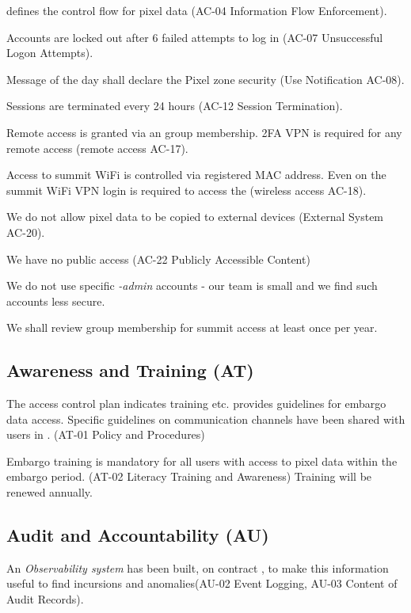  defines the control flow for pixel data (AC-04  Information Flow Enforcement).

Accounts are locked out after 6 failed attempts to log in (AC-07  Unsuccessful Logon Attempts).

Message of the day shall declare the Pixel zone security (Use Notification AC-08).

Sessions are terminated every 24 hours (AC-12  Session Termination).

Remote access is granted via an group membership. 2FA VPN is required for any remote access (remote access AC-17).

Access to summit WiFi is controlled via registered MAC address.
Even on the summit WiFi VPN login is required to access the \PZ (wireless access AC-18).


We do not allow pixel data to be copied to external devices (External System AC-20).

We have no public access (AC-22  Publicly Accessible Content)

We do not use specific \emph{-admin} accounts  - our team is small and we find such accounts less secure.

We shall review group membership for summit access at least once per year.



\subsection{Awareness and Training (AT)} \label{sec:AT}

The access control plan \citep{ACP} indicates training etc.
 provides guidelines for embargo data access.
Specific guidelines on communication channels have been shared with users in .
(AT-01  Policy and Procedures)

Embargo training is mandatory for all users with access to pixel data within the embargo period. (AT-02  Literacy Training and Awareness)
Training will be renewed annually.


\subsection{Audit and Accountability (AU)} \label{sec:AU}
An \emph{Observability system} has been built, on contract , to make this information useful to find incursions and anomalies(AU-02  Event Logging,  AU-03  Content of Audit Records).

